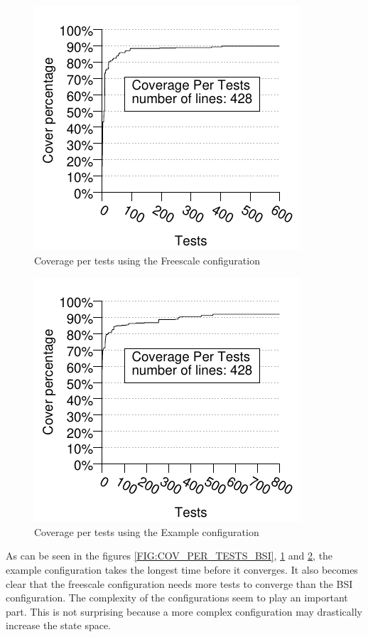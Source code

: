 \begin{figure}[!ht]
\begin{center}
\includegraphics{generated_pictures/coverage_per_tests_freescale.pdf}
\end{center}
\caption{Coverage per tests using the Freescale configuration}
\label{FIG:COV_PER_TESTS_FREESCALE}
\end{figure}


\begin{figure}[!ht]
\begin{center}
\includegraphics{generated_pictures/coverage_per_tests_example.pdf}
\end{center}
\caption{Coverage per tests using the Example configuration}
\label{FIG:COV_PER_TESTS_EXAMPLE}
\end{figure}

As can be seen in the figures \ref{FIG:COV_PER_TESTS_BSI},
\ref{FIG:COV_PER_TESTS_FREESCALE} and \ref{FIG:COV_PER_TESTS_EXAMPLE},
the example configuration takes the longest time before it
converges. It also becomes clear that the freescale configuration
needs more tests to converge than the BSI configuration. The
complexity of the configurations seem to play an important
part. This is not surprising because a more complex configuration may
drastically increase the state space.

